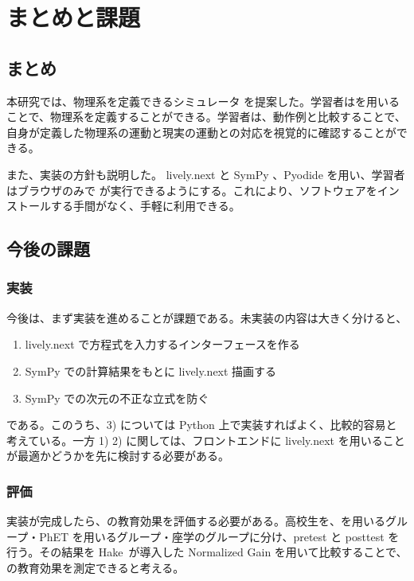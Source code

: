 \chapter{まとめと課題} \label{conclusion}

\section{まとめ}
本研究では、物理系を定義できるシミュレータ \simname を提案した。学習者は\simname を用いることで、物理系を定義することができる。学習者は、動作例と比較することで、自身が定義した物理系の運動と現実の運動との対応を視覚的に確認することができる。

また、実装の方針も説明した。 lively.next と SymPy 、Pyodide を用い、学習者はブラウザのみで \simname が実行できるようにする。これにより、ソフトウェアをインストールする手間がなく、手軽に利用できる。

\section{今後の課題}

\subsection{実装}

今後は、まず実装を進めることが課題である。未実装の内容は大きく分けると、
\begin{enumerate}
  \item lively.next で方程式を入力するインターフェースを作る
  \item SymPy での計算結果をもとに lively.next 描画する
  \item SymPy での次元の不正な立式を防ぐ
\end{enumerate}
である。このうち、3) については Python 上で実装すればよく、比較的容易と考えている。一方 1) 2) に関しては、フロントエンドに lively.next を用いることが最適かどうかを先に検討する必要がある。

\subsection{評価}

実装が完成したら、\simname の教育効果を評価する必要がある。高校生を、\simname を用いるグループ・PhET を用いるグループ・座学のグループに分け、pretest と posttest を行う。その結果を Hake~\cite{hake_1998}が導入した Normalized Gain を用いて比較することで、\simname の教育効果を測定できると考える。

